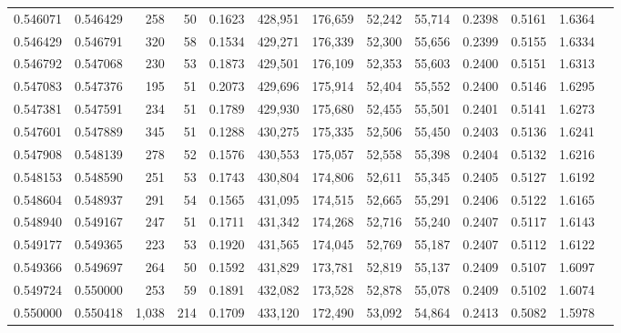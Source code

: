 \begin{tabular}{rrrrrrrrrrrrr}
0.546071 & 0.546429 &    258 &    50 &                                     0.1623 & 428,951 & 176,659 &  52,242 &  55,714 & 0.2398 & 0.5161 & 1.6364 \\
0.546429 & 0.546791 &    320 &    58 &                                     0.1534 & 429,271 & 176,339 &  52,300 &  55,656 & 0.2399 & 0.5155 & 1.6334 \\
0.546792 & 0.547068 &    230 &    53 &                                     0.1873 & 429,501 & 176,109 &  52,353 &  55,603 & 0.2400 & 0.5151 & 1.6313 \\
0.547083 & 0.547376 &    195 &    51 &                                     0.2073 & 429,696 & 175,914 &  52,404 &  55,552 & 0.2400 & 0.5146 & 1.6295 \\
0.547381 & 0.547591 &    234 &    51 &                                     0.1789 & 429,930 & 175,680 &  52,455 &  55,501 & 0.2401 & 0.5141 & 1.6273 \\
0.547601 & 0.547889 &    345 &    51 &                                     0.1288 & 430,275 & 175,335 &  52,506 &  55,450 & 0.2403 & 0.5136 & 1.6241 \\
0.547908 & 0.548139 &    278 &    52 &                                     0.1576 & 430,553 & 175,057 &  52,558 &  55,398 & 0.2404 & 0.5132 & 1.6216 \\
0.548153 & 0.548590 &    251 &    53 &                                     0.1743 & 430,804 & 174,806 &  52,611 &  55,345 & 0.2405 & 0.5127 & 1.6192 \\
0.548604 & 0.548937 &    291 &    54 &                                     0.1565 & 431,095 & 174,515 &  52,665 &  55,291 & 0.2406 & 0.5122 & 1.6165 \\
0.548940 & 0.549167 &    247 &    51 &                                     0.1711 & 431,342 & 174,268 &  52,716 &  55,240 & 0.2407 & 0.5117 & 1.6143 \\
0.549177 & 0.549365 &    223 &    53 &                                     0.1920 & 431,565 & 174,045 &  52,769 &  55,187 & 0.2407 & 0.5112 & 1.6122 \\
0.549366 & 0.549697 &    264 &    50 &                                     0.1592 & 431,829 & 173,781 &  52,819 &  55,137 & 0.2409 & 0.5107 & 1.6097 \\
0.549724 & 0.550000 &    253 &    59 &                                     0.1891 & 432,082 & 173,528 &  52,878 &  55,078 & 0.2409 & 0.5102 & 1.6074 \\
0.550000 & 0.550418 &  1,038 &   214 &                                     0.1709 & 433,120 & 172,490 &  53,092 &  54,864 & 0.2413 & 0.5082 & 1.5978 \\

\end{tabular}
